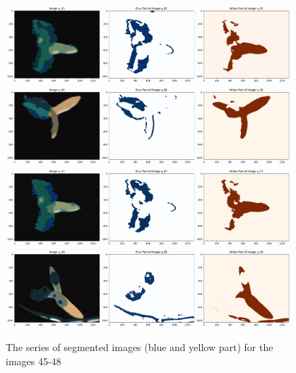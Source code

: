 \documentclass{article}
\begin{document}
\begin{figure}[h!]
\centering
\includegraphics[width=0.95\textwidth]{Report/Images/Appendix Images/ColorSegments/Image45.png}
\includegraphics[width=0.95\textwidth]{Report/Images/Appendix Images/ColorSegments/Image46.png}
\includegraphics[width=0.95\textwidth]{Report/Images/Appendix Images/ColorSegments/Image47.png}
\includegraphics[width=0.95\textwidth]{Report/Images/Appendix Images/ColorSegments/Image48.png}
\caption{The series of segmented images (blue and yellow part) for the images 45-48} 
\label{fig:segment45-48}
\end{figure}
\end{document}
